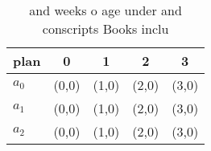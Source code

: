 \documentclass[a4paper]{article}
\begin{document}
\begin{table}
\begin{adjustbox}{width=0.6\columnwidth}
\begin{tabular}{|l|l|l|l|l|}
\hline
\textbf{plan} & \multicolumn{1}{c|}{\textbf{0}} & \multicolumn{1}{c|}{\textbf{1}} & \multicolumn{1}{c|}{\textbf{2}} & \multicolumn{1}{c|}{\textbf{3}} \\ \hline
\textbf{$a_0$}  & (0,0) & (1,0) & (2,0) & (3,0) \\ \hline
\textbf{$a_1$}  & (0,0) & (1,0) & (2,0) & (3,0) \\ \hline
\textbf{$a_2$}  & (0,0) & (1,0) & (2,0) & (3,0) \\ \hline
\end{tabular}
\end{adjustbox}
\caption{ and weeks o age under and conscripts Books inclu
}
\end{table}
\end{document}
